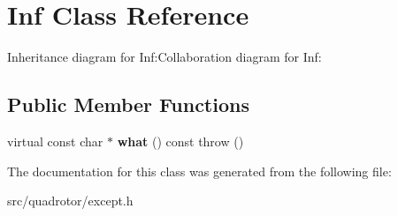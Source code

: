 \hypertarget{classInf}{
\section{Inf Class Reference}
\label{classInf}
}
Inheritance diagram for Inf:Collaboration diagram for Inf:\subsection*{Public Member Functions}
\begin{DoxyCompactItemize}
\item 
\hypertarget{classInf_ad631c9e417358223b219a0d27321ccab}{
virtual const char $\ast$ {\bfseries what} () const   throw ()}
\label{classInf_ad631c9e417358223b219a0d27321ccab}

\end{DoxyCompactItemize}


The documentation for this class was generated from the following file:\begin{DoxyCompactItemize}
\item 
src/quadrotor/except.h\end{DoxyCompactItemize}
